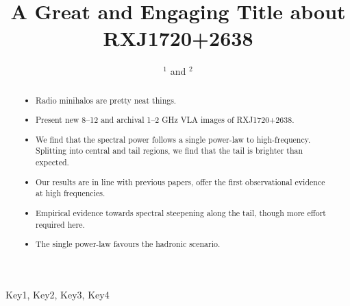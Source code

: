 \documentclass{pas}
\begin{document}



\title{A Great and Engaging Title about RXJ1720+2638}

\author{ $^{1}$ and  $^{2}$}





\begin{abstract}
\begin{itemize}
  \item Radio minihalos are pretty neat things.
  \item Present new 8--12 and archival 1--2 GHz VLA images of RXJ1720+2638.
  \item We find that the spectral power follows a single power-law to high-frequency. Splitting into central and tail regions, we find that the tail is brighter than expected. 
  \item Our results are in line with previous papers, offer the first observational evidence at high frequencies. 
  \item Empirical evidence towards spectral steepening along the tail, though more effort required here. 
  \item The single power-law favours the hadronic scenario.   
\end{itemize}
  

\end{abstract}

\begin{keywords}
Key1, Key2, Key3, Key4
\end{keywords}

\maketitle
\end{document}
